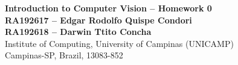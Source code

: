 \documentclass[10pt, a4paper]{article}
\begin{document}
\begin{center}

\textbf{Introduction to Computer Vision -- Homework 0} \\[0.1cm]

\textbf{RA192617 -- Edgar Rodolfo Quispe Condori} \\[0.1cm]
\textbf{RA192618 -- Darwin Ttito Concha} \\[0.1cm]

Institute of Computing, University of Campinas (UNICAMP) \\
Campinas-SP, Brazil, 13083-852 \\
\end{center}





\end{document}
